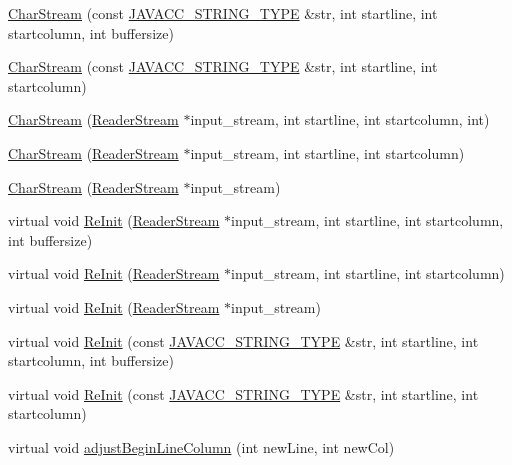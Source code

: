 \begin{DoxyCompactItemize}
\item 
\hyperlink{classvhdl_1_1parser_1_1_char_stream_afdec6175c31615bddb10d937a740ff5d}{Char\+Stream} (const \hyperlink{_java_c_c_8h_a7941da0682a76ffa9869d8458e166062}{J\+A\+V\+A\+C\+C\+\_\+\+S\+T\+R\+I\+N\+G\+\_\+\+T\+Y\+P\+E} \&str, int startline, int startcolumn, int buffersize)
\item 
\hyperlink{classvhdl_1_1parser_1_1_char_stream_aad7f99f71d1af1a9496f56e09a819333}{Char\+Stream} (const \hyperlink{_java_c_c_8h_a7941da0682a76ffa9869d8458e166062}{J\+A\+V\+A\+C\+C\+\_\+\+S\+T\+R\+I\+N\+G\+\_\+\+T\+Y\+P\+E} \&str, int startline, int startcolumn)
\item 
\hyperlink{classvhdl_1_1parser_1_1_char_stream_aa152803b833b89e3205745d174a59929}{Char\+Stream} (\hyperlink{class_reader_stream}{Reader\+Stream} $\ast$input\+\_\+stream, int startline, int startcolumn, int)
\item 
\hyperlink{classvhdl_1_1parser_1_1_char_stream_a7a3b115d9cb6f671539a8db6630f515c}{Char\+Stream} (\hyperlink{class_reader_stream}{Reader\+Stream} $\ast$input\+\_\+stream, int startline, int startcolumn)
\item 
\hyperlink{classvhdl_1_1parser_1_1_char_stream_a82949d505a06f19999787ee61f85f7a7}{Char\+Stream} (\hyperlink{class_reader_stream}{Reader\+Stream} $\ast$input\+\_\+stream)
\item 
virtual void \hyperlink{classvhdl_1_1parser_1_1_char_stream_a2c28db2d646530d6fc446bbfbe3a1c9d}{Re\+Init} (\hyperlink{class_reader_stream}{Reader\+Stream} $\ast$input\+\_\+stream, int startline, int startcolumn, int buffersize)
\item 
virtual void \hyperlink{classvhdl_1_1parser_1_1_char_stream_a93c0e6b18d38b9df067c39ca157df86a}{Re\+Init} (\hyperlink{class_reader_stream}{Reader\+Stream} $\ast$input\+\_\+stream, int startline, int startcolumn)
\item 
virtual void \hyperlink{classvhdl_1_1parser_1_1_char_stream_a147a1e6e2f7cc4d9dc423bc40a542a66}{Re\+Init} (\hyperlink{class_reader_stream}{Reader\+Stream} $\ast$input\+\_\+stream)
\item 
virtual void \hyperlink{classvhdl_1_1parser_1_1_char_stream_aa63473f578fa18b87448b995e99b06b5}{Re\+Init} (const \hyperlink{_java_c_c_8h_a7941da0682a76ffa9869d8458e166062}{J\+A\+V\+A\+C\+C\+\_\+\+S\+T\+R\+I\+N\+G\+\_\+\+T\+Y\+P\+E} \&str, int startline, int startcolumn, int buffersize)
\item 
virtual void \hyperlink{classvhdl_1_1parser_1_1_char_stream_afdf2ecf97212d2b2a48d630c3a8e5521}{Re\+Init} (const \hyperlink{_java_c_c_8h_a7941da0682a76ffa9869d8458e166062}{J\+A\+V\+A\+C\+C\+\_\+\+S\+T\+R\+I\+N\+G\+\_\+\+T\+Y\+P\+E} \&str, int startline, int startcolumn)
\item 
virtual void \hyperlink{classvhdl_1_1parser_1_1_char_stream_adbbf03df44c5e7100b068945c6a318c0}{adjust\+Begin\+Line\+Column} (int new\+Line, int new\+Col)
\end{DoxyCompactItemize}

